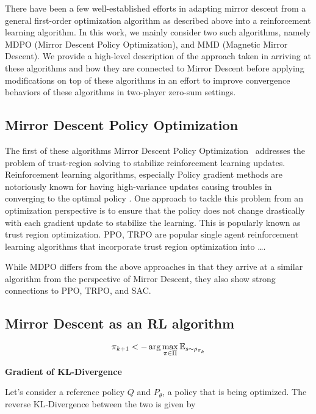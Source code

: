 There have been a few well-established efforts in adapting mirror descent from a general
first-order optimization algorithm as described above into a reinforcement learning algorithm.
In this work, we mainly consider two such algorithms, namely MDPO (Mirror Descent Policy
Optimization), and MMD (Magnetic Mirror Descent).
We provide a high-level description of the approach taken in arriving at these algorithms and how
they are connected to Mirror Descent before applying modifications on top of these algorithms in an
effort to improve convergence behaviors of these algorithms in two-player zero-sum settings.

\subsection[MDPO]{Mirror Descent Policy Optimization}

The first of these algorithms Mirror Descent Policy Optimization~\cite{tomarMirror2022} addresses
the problem of trust-region solving to stabilize reinforcement learning updates.
Reinforcement learning algorithms, especially Policy gradient methods are notoriously known for
having high-variance updates causing troubles in converging to the optimal policy .
One approach to tackle this problem from an optimization perspective is to ensure that the policy
does not change drastically with each gradient update to stabilize the learning.
This is popularly known as trust region optimization.
PPO, TRPO are popular single agent reinforcement learning algorithms that incorporate trust region
optimization into \dots {}.
\cite{schulmanProximal2017}

While MDPO differs from the above approaches in that they arrive at a similar algorithm from the
perspective of Mirror Descent, they also show strong connections to PPO, TRPO, and SAC.

\subsection{Mirror Descent as an RL algorithm}

$$ \pi_{k+1} <- \arg \max_{\pi \in \Pi} \mathbb{E}_{s \sim \rho_{\pi_k}} $$


\textbf{Gradient of KL-Divergence}

Let's consider a reference policy $Q$ and $P_{\theta}$, a policy that is being optimized. 
The reverse KL-Divergence between the two is given by

